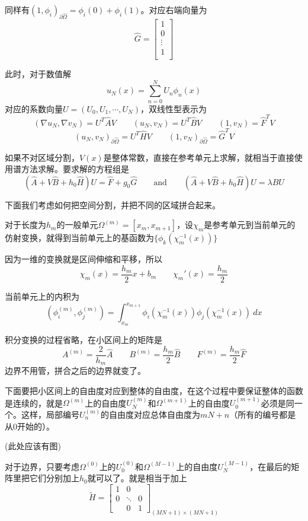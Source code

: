 \documentclass[UTF8,12pt]{article}
\begin{document}
同样有$(1, \phi_i)_{\partial\hat{\Omega}} = \phi_i(0) + \phi_i(1)$。对应右端向量为
\begin{equation}
\hat{G} = \left[ \begin{array}{c}
1 \\
0 \\
\vdots \\
1 \\
\end{array} \right]
\end{equation}

此时，对于数值解
$$ u_N(x) = \sum_{n = 0}^{N} U_{n} \phi_n(x) $$
对应的系数向量$U = (U_0, U_1, \cdots, U_N)$，双线性型表示为
$$ (\nabla u_N, \nabla v_N) = U^T \hat{A} V \qquad (u_N, v_N) = U^T \hat{B} V \qquad (1, v_N) = \hat{F}^T V $$
$$ (u_N, v_N)_{\partial\hat{\Omega}} = U^T \hat{H} V \qquad (1, v_N)_{\partial\hat{\Omega}} = \hat{G}^T V $$

如果不对区域分割，$V(x)$是整体常数，直接在参考单元上求解，就相当于直接使用谱方法求解。要求解的方程组是
\begin{equation}
(\hat{A} + V \hat{B} + h_0 \hat{H}) U = \hat{F} + g_0 \hat{G} \qquad \text{and} \qquad (\hat{A} + V \hat{B} + h_0 \hat{H}) U = \lambda \hat{B} U
\end{equation}


下面我们考虑如何把空间分割，并把不同的区域拼合起来。

对于长度为$h_m$的一般单元$\Omega^{(m)} = [x_m, x_{m+1}]$，设$\chi_m$是参考单元到当前单元的仿射变换，就得到当前单元上的基函数为$\{\phi_{k}(\chi_m^{-1}(x))\}$

因为一维的变换就是区间伸缩和平移，所以
$$ \chi_m(x) = \frac{h_m}{2} x + b_m \qquad \chi_m'(x) = \frac{h_m}{2} $$

当前单元上的内积为
$$ (\phi^{(m)}_i, \phi^{(m)}_j) = \int_{x_m}^{x_{m+1}} \phi_{i}(\chi_m^{-1}(x)) \phi_{j}(\chi_m^{-1}(x)) \ dx $$

积分变换的过程省略，在小区间上的矩阵是
$$ A^{(m)} = \frac{2}{h_m} \hat{A} \qquad B^{(m)} = \frac{h_m}{2} \hat{B} \qquad F^{(m)} = \frac{h_m}{2} \hat{F} $$
边界不用管，拼合之后的边界就变了。

下面要把小区间上的自由度对应到整体的自由度，在这个过程中要保证整体的函数是连续的，就是$\Omega^{(m)}$上的自由度$U^{(m)}_N$和$\Omega^{(m+1)}$上的自由度$U^{(m+1)}_0$必须是同一个。这样，局部编号$U^{(m)}_n$的自由度对应总体自由度为$m N + n$（所有的编号都是从0开始的）。

(此处应该有图)

对于边界，只要考虑$\Omega^{(0)}$上的$U^{(0)}_0$和$\Omega^{(M-1)}$上的自由度$U^{(M-1)}_N$，在最后的矩阵里把它们分别加上$h_0$就可以了。就是相当于加上
\begin{equation}
\tilde{H} = \left[ \begin{array}{ccc}
1 & 0 &  \\ 
0 & \ddots & 0 \\ 
& 0 & 1
\end{array} \right]_{(MN+1) \times (MN+1)}
\end{equation}
\end{document}
